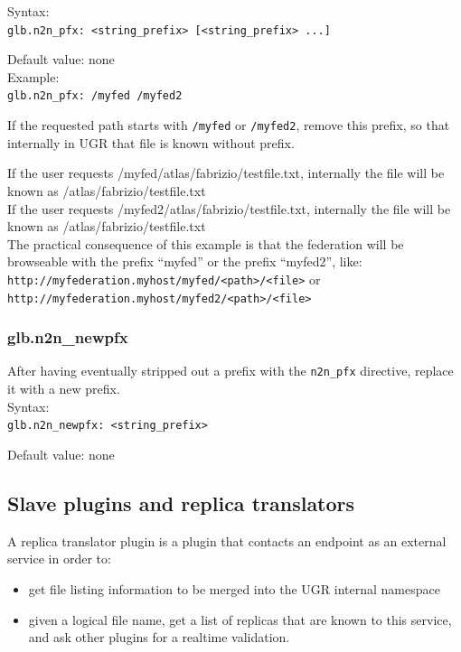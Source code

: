 \documentclass[12pt]{article} %
\begin{document}
Syntax:\\
\lstinline"glb.n2n_pfx: <string_prefix> [<string_prefix> ...]"

Default value: none
\\
Example:\\

\lstinline"glb.n2n_pfx: /myfed /myfed2"

If the requested path starts with \lstinline"/myfed" or \lstinline"/myfed2", remove this prefix, so that internally in UGR that file is known without prefix.

If the user requests /myfed/atlas/fabrizio/testfile.txt, internally the file will be known as /atlas/fabrizio/testfile.txt\\
If the user requests /myfed2/atlas/fabrizio/testfile.txt, internally the file will be known as /atlas/fabrizio/testfile.txt\\
The practical consequence of this example is that the federation will be browseable with the prefix ``myfed'' or the prefix ``myfed2'', like:\\
\lstinline"http://myfederation.myhost/myfed/<path>/<file>" or \\
\lstinline"http://myfederation.myhost/myfed2/<path>/<file>"

\subsubsection{glb.n2n\_newpfx}

After having eventually stripped out a prefix with the \lstinline"n2n_pfx" directive, replace it with a new prefix.\\
Syntax:\\
\lstinline"glb.n2n_newpfx: <string_prefix>"

Default value: none


\subsection{Slave plugins and replica translators}

A replica translator plugin is a plugin that contacts an endpoint as an external service in order to:

\begin{itemize}
 \item get file listing information to be merged into the UGR internal namespace
 \item given a logical file name, get a list of replicas that are known to this service, and ask other plugins for a realtime validation.
\end{itemize}
\end{document}
